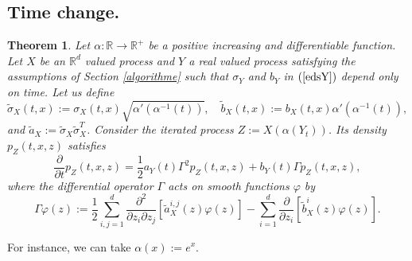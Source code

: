 \documentclass[a4paper, 11pt]{article}
\newtheorem{thm}{Theorem}%
\newcommand{\R}{\mathbb{R}}
\newcommand{\1}{\mathbf{1}}
\begin{document}
\subsection{Time change.}
\begin{thm}\label{changementdetemps}
Let $\alpha:\R \rightarrow {\R}^+$ be a positive increasing and differentiable function. Let $X$ be an $\R^d$ valued process and $Y$ a real valued process satisfying the assumptions of Section \ref{algorithme} such that $\sigma_Y$ and $b_Y$ in $(\ref{edsY})$ depend only on time. Let us define
\begin{equation*}
\tilde{\sigma}_X(t,x):=\sigma_X(t,x)\sqrt{\alpha'(\alpha^{-1}(t))},\quad {\tilde b}_X(t,x):=b_X(t,x)\alpha'(\alpha^{-1}(t)),
\end{equation*}
and $\tilde{a}_X:=\tilde{\sigma}_X \tilde{\sigma}_X^T$. Consider the iterated process $Z:=X(\alpha(Y_t))$. Its density $p_Z(t,x,z)$ satisfies
\begin{equation*}
\frac{\partial}{\partial t}p_Z(t,x,z)=\frac{1}{2}a_Y(t)\Gamma^2 p_Z(t,x,z)+b_Y(t)\Gamma p_Z(t,x,z),
\end{equation*}
where the differential operator $\Gamma$ acts on smooth functions $\varphi$ by
\begin{equation*}
\Gamma\varphi(z):=\frac{1}{2}\sum_{i,j=1}^d\frac{\partial^2}{\partial z_i\partial z_j} \left[\tilde{a}^{i,j}_X(z)\varphi(z)\right]-\sum_{i=1}^d\frac{\partial}{\partial z_i} \left[\tilde{b}^i_X(z)\varphi(z)\right].
\end{equation*}
\end{thm}
For instance, we can take $\alpha(x):=e^x$.\\
\end{document}
